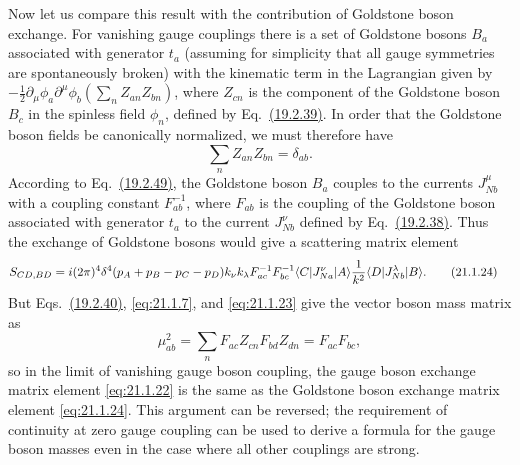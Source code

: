 Now let us compare this result with the contribution of Goldstone boson
exchange. For vanishing gauge couplings there is a set of Goldstone bosons
$B_a$ associated with generator $t_a$ (assuming for simplicity
that all gauge symmetries are spontaneously broken) with the kinematic term
in the Lagrangian given by
$-\frac12\partial_\mu\phi_a\partial^\mu\phi_b
\left(\sum_nZ_{a n}Z_{b n}\right)$, where $Z_{c n}$ is the
component of the Goldstone boson $B_c$ in the spinless field $\phi_n$,
defined by
Eq.~\hyperref[eq:19.2.39]{(19.2.39)}. In order that the Goldstone boson
fields be canonically normalized, we must therefore have
\begin{equation}
 \sum_n Z_{a n}Z_{b n}=\delta_{ab}.
 \tag{21.1.23}\label{eq:21.1.23}
\end{equation}
According to Eq.~\hyperref[eq:19.2.49]{(19.2.49)}, the Goldstone boson
$B_a$ couples to the currents $J_{Nb}^{\mu}$ with a coupling
constant $F^{-1}_{ab}$, where $F_{ab}$ is the coupling of
the Goldstone boson associated with generator $t_a$ to the current
$J_{Nb}^{\nu}$ defined by Eq.~\hyperref[eq:19.2.38]{(19.2.38)}. Thus
the exchange of Goldstone bosons would give a scattering matrix element
\begin{align}
 S_{CD,BD}={}&i(2\pi)^4\delta^4(p_A+p_B-p_C-p_D)
 k_\nu k_\lambda
 F^{-1}_{ac}F^{-1}_{bc}
 \langle C\rvert J_{Na}^{\nu}\lvert A\rangle
 \frac1{k^2}
 \langle D\rvert J_{Nb}^{\lambda}\lvert B\rangle.
 \tag{21.1.24}\label{eq:21.1.24}
\end{align}
But Eqs.~\hyperref[eq:19.2.40]{(19.2.40)}, \eqref{eq:21.1.7}, and
\eqref{eq:21.1.23} give the vector boson mass matrix as
\begin{equation}
 \mu^2_{ab}
 =\sum_n F_{ac}Z_{c n}
 F_{bd}Z_{d n}
 =F_{ac}F_{bc},
 \tag{21.1.25}\label{eq:21.1.25}
\end{equation}
so in the limit of vanishing gauge boson coupling, the gauge boson exchange
matrix element \eqref{eq:21.1.22} is the same as the Goldstone boson
exchange matrix element \eqref{eq:21.1.24}. This argument can be reversed;
the requirement of continuity at zero gauge coupling can be used to derive
a formula for the gauge boson masses even in the case where all other
couplings are strong.
